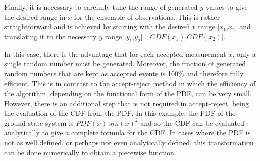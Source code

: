 \documentclass[UKenglish,texlive=2016]{\ATLASLATEXPATH atlasdoc}
\begin{document}
Finally, it is necessary to carefully tune the range of generated $y$ values to give the desired range in $x$ for the ensemble of observations.  This is rather straightforward and is achieved by starting with the desired $x$ range [$x_1$,$x_2$] and translating it to the necessary $y$ range [$y_1$,$y_2$]=[$CDF(x_1)$,$CDF(x_2)$].  

In this case, there is the advantage that for each accepted measurement $x$, only a single random number must be generated.  Moreover, the fraction of generated random numbers that are kept as accepted events is 100\% and therefore fully efficient.  This is in contrast to the accept-reject method in which the efficiency of the algorithm, depending on the functional form of the PDF, can be very small.  However, there is an additional step that is not required in accept-reject, being the evaluation of the CDF from the PDF.  In this example, the PDF of the ground state system is $PDF(x)~sin(x)^2$ and so the CDF can be evaluated analytically to give a complete formula for the CDF.  In cases where the PDF is not as well defined, or perhaps not even analytically defined, this transformation can be done numerically to obtain a piecewise function. 

\begin{center}
\end{center}

\begin{center}
\end{center}
\end{document}
